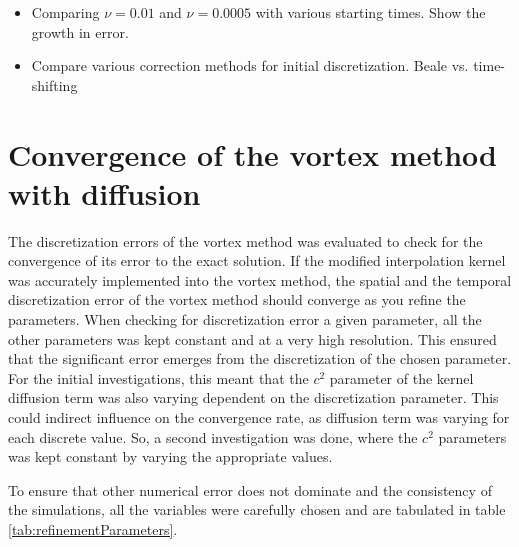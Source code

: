 \begin{itemize}
\item Comparing $\nu=0.01$ and $\nu=0.0005$ with various starting times. Show the growth in error. 
\item Compare various correction methods for initial discretization. Beale vs. time-shifting
\end{itemize}

\section{Convergence of the vortex method with diffusion}
The discretization errors of the vortex method was evaluated to check for the convergence of its error to the exact solution. If the modified interpolation kernel was accurately implemented into the vortex method, the spatial and the temporal discretization error of the vortex method should converge as you refine the parameters. When checking for discretization error a given parameter, all the other parameters was kept constant and at a very high resolution. This ensured that the significant error emerges from the discretization of the chosen parameter. For the initial investigations, this meant that the $c^2$ parameter of the kernel diffusion term was also varying dependent on the discretization parameter. This could indirect influence on the convergence rate, as diffusion term was varying for each discrete value. So, a second investigation was done, where the $c^2$ parameters was kept constant by varying the appropriate values.

To ensure that other numerical error does not dominate and the consistency of the simulations, all the variables were carefully chosen and are tabulated in table \ref{tab:refinementParameters}.\\


